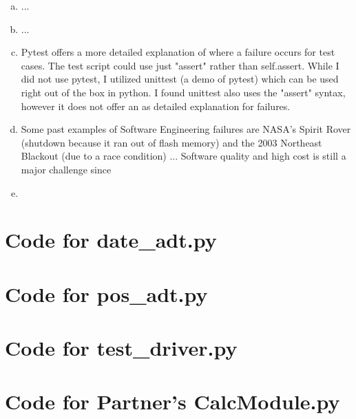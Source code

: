 \documentclass[12pt]{article}
\begin{document}
\begin{enumerate}[(a)]

\item 
...

\item 
...

\item 
Pytest offers a more detailed explanation of where a failure occurs for test cases. The test script could use just "assert" rather than
self.assert. While I did not use pytest, I utilized unittest (a demo of pytest) which can be used right out of the box in python. I found unittest also uses the "assert" syntax, however it does not offer an as detailed explanation for failures.

\item 
Some past examples of Software Engineering failures are NASA's Spirit Rover (shutdown because it ran out of flash memory) and the 2003 Northeast Blackout (due to a race condition) ... Software quality and high cost is still a major challenge since  

\item 



\end{enumerate}

\newpage

\lstset{language=Python, basicstyle=\tiny, breaklines=true, showspaces=false,
  showstringspaces=false, breakatwhitespace=true}

\def\thesection{\Alph{section}}

\section{Code for date\_adt.py}

\noindent 

\newpage

\section{Code for pos\_adt.py}

\noindent 

\newpage

\section{Code for test\_driver.py}

\noindent 

\newpage

\section{Code for Partner's CalcModule.py}

\noindent 
\end{document}
